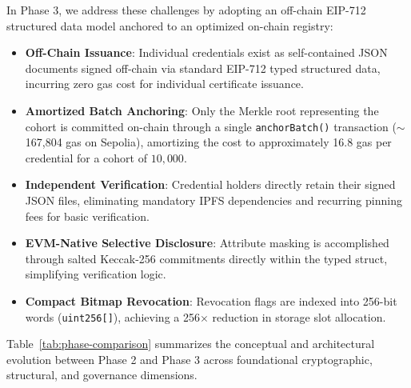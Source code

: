 In Phase 3, we address these challenges by adopting an off-chain EIP-712 structured data model anchored to an optimized on-chain registry:
\begin{itemize}
    \item \textbf{Off-Chain Issuance}: Individual credentials exist as self-contained JSON documents signed off-chain via standard EIP-712 typed structured data, incurring zero gas cost for individual certificate issuance.
    \item \textbf{Amortized Batch Anchoring}: Only the Merkle root representing the cohort is committed on-chain through a single \texttt{anchorBatch()} transaction ($\sim$167,804 gas on Sepolia), amortizing the cost to approximately 16.8 gas per credential for a cohort of $10{,}000$.
    \item \textbf{Independent Verification}: Credential holders directly retain their signed JSON files, eliminating mandatory IPFS dependencies and recurring pinning fees for basic verification.
    \item \textbf{EVM-Native Selective Disclosure}: Attribute masking is accomplished through salted Keccak-256 commitments directly within the typed struct, simplifying verification logic.
    \item \textbf{Compact Bitmap Revocation}: Revocation flags are indexed into 256-bit words (\texttt{uint256[]}), achieving a 256$\times$ reduction in storage slot allocation.
\end{itemize}

Table~\ref{tab:phase-comparison} summarizes the conceptual and architectural evolution between Phase 2 and Phase 3 across foundational cryptographic, structural, and governance dimensions.

